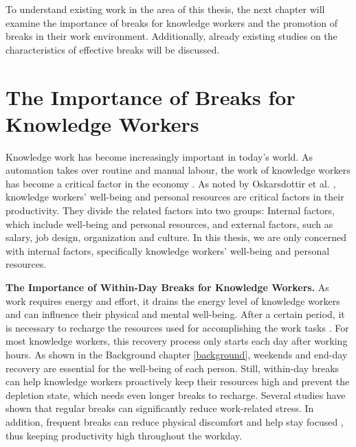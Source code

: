 \documentclass{hasel_thesis}
\begin{document}
To understand existing work in the area of this thesis, the next chapter will examine the importance of breaks for knowledge workers and the promotion of breaks in their work environment. Additionally, already existing studies on the characteristics of effective breaks will be discussed.

\section{The Importance of Breaks for Knowledge Workers}

Knowledge work has become increasingly important in today's world. As automation takes over routine and manual labour, the work of knowledge workers has become a critical factor in the economy \cite{Oskarsdottir.2022}. As noted by Oskarsdottir et al. \cite{Oskarsdottir.2022}, knowledge workers' well-being and personal resources are critical factors in their productivity. They divide the related factors into two groups: Internal factors, which include well-being and personal resources, and external factors, such as salary, job design, organization and culture.
In this thesis, we are only concerned with internal factors, specifically knowledge workers' well-being and personal resources.

\textbf{The Importance of Within-Day Breaks for Knowledge Workers.}
As work requires energy and effort, it drains the energy level of knowledge workers and can influence their physical and mental well-being. After a certain period, it is necessary to recharge the resources used for accomplishing the work tasks \cite{Sonnentag.2006}. For most knowledge workers, this recovery process only starts each day after working hours. As shown in the Background chapter \ref{background}, weekends and end-day recovery are essential for the well-being of each person. Still, within-day breaks can help knowledge workers proactively keep their resources high and prevent the depletion state, which needs even longer breaks to recharge. Several studies \cite{Largo-Wight.2017, KimS.ParkY.&Niu.2017} have shown that regular breaks can significantly reduce work-related stress. In addition, frequent breaks can reduce physical discomfort \cite{Waongenngarm.2018} and help stay focused \cite{Packer.2021}, thus keeping productivity high throughout the workday.
\end{document}
